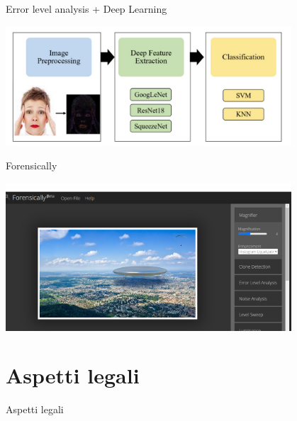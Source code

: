 \documentclass[11pt]{beamer}
\begin{document}
\begin{frame}{Error level analysis + Deep Learning \cite{rafique2023deep}}
\begin{center}
\includegraphics[width=0.8\textwidth]{Pic/ELA+DEEP.png}
\end{center}
\end{frame}

\begin{frame}{Forensically \cite{fr}}
\begin{center}
\includegraphics[width=0.8\textwidth]{Pic/forensically.png}
\end{center}
\end{frame}



\section{Aspetti legali}

\begin{frame}
\begin{center}
\Huge
Aspetti legali
\end{center}
\end{frame}
\end{document}
